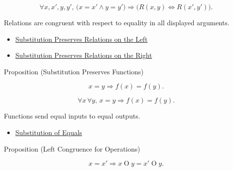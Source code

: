 \begin{remark*}
\[
\forall x,x',y,y',\,
\bigl(x=x'\land y=y'\bigr)
\Longrightarrow
\bigl(R(x,y)\Longleftrightarrow R(x',y')\bigr).
\]
\end{remark*}

\begin{remark*}[Interpretation]
Relations are congruent with respect to equality in all displayed arguments.
\end{remark*}

\begin{dependencies}
\begin{itemize}
  \item \hyperref[prop:substitution-preserves-relations-left]{Substitution Preserves Relations on the Left}
  \item \hyperref[prop:substitution-preserves-relations-right]{Substitution Preserves Relations on the Right}
\end{itemize}
\end{dependencies}

\begin{propositionbox}{Proposition (Substitution Preserves Functions)}
\begin{proposition}
\label{prop:substitution-preserves-functions}
\[
x=y \Longrightarrow f(x)=f(y).
\]
\end{proposition}
\end{propositionbox}

\begin{remark*}
\[
\forall x\,\forall y,\,
x=y \Longrightarrow f(x)=f(y).
\]
\end{remark*}

\begin{remark*}[Interpretation]
Functions send equal inputs to equal outputs.
\end{remark*}

\begin{dependencies}
\begin{itemize}
  \item \hyperref[ax:equality-substitution]{Substitution of Equals}
\end{itemize}
\end{dependencies}

\begin{propositionbox}{Proposition (Left Congruence for Operations)}
\begin{proposition}
\label{prop:substitution-preserves-operations-left}
\[
x=x' \Longrightarrow x\mathbin{O}y=x'\mathbin{O}y.
\]
\end{proposition}
\end{propositionbox}

